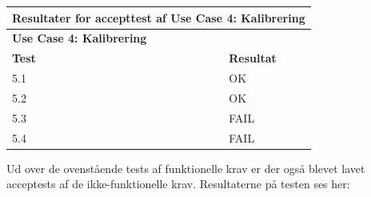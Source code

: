 \clearpage

\begin{table}[h!]
	\centering
	\begin{tabular}{ll}
		\multicolumn{2}{l}{\cellcolor[HTML]{187ABD}\textbf{Resultater for accepttest af Use Case 4: Kalibrering}} \\ \hline
		\multicolumn{1}{l|}{\textbf{Use Case 4: Kalibrering}} &  \\ \hline
		\multicolumn{1}{l|}{\textbf{Test}} & \textbf{Resultat} \\ \hline
		\multicolumn{1}{l|}{5.1} & OK \\ \hline
		\multicolumn{1}{l|}{5.2} & OK \\ \hline
		\multicolumn{1}{l|}{5.3} & FAIL \\ \hline
		\multicolumn{1}{l|}{5.4} & FAIL
	\end{tabular}
\end{table}

Ud over de ovenstående tests af funktionelle krav er der også blevet lavet acceptests af de ikke-funktionelle krav. Resultaterne på testen ses her: 

